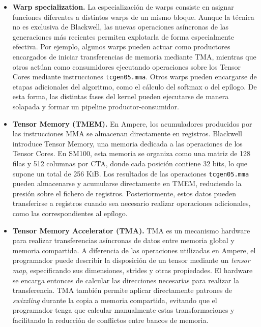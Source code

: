\begin{itemize}

\item \textbf{Warp specialization.}
La especialización de warps consiste en asignar funciones diferentes a distintos warps de un mismo bloque. Aunque la técnica no es exclusiva de Blackwell, las nuevas operaciones asíncronas de las generaciones más recientes permiten explotarla de forma especialmente efectiva. Por ejemplo, algunos warps pueden actuar como productores encargados de iniciar transferencias de memoria mediante TMA, mientras que otros actúan como consumidores ejecutando operaciones sobre los Tensor Cores mediante instrucciones \texttt{tcgen05.mma}. Otros warps pueden encargarse de etapas adicionales del algoritmo, como el cálculo del softmax o del epílogo. De esta forma, las distintas fases del kernel pueden ejecutarse de manera solapada y formar un pipeline productor-consumidor.

\item \textbf{Tensor Memory (TMEM).}
En Ampere, los acumuladores producidos por las instrucciones MMA se almacenan directamente en registros. Blackwell introduce Tensor Memory, una memoria dedicada a las operaciones de los Tensor Cores. En SM100, esta memoria se organiza como una matriz de 128 filas y 512 columnas por CTA, donde cada posición contiene 32 bits, lo que supone un total de 256 KiB. Los resultados de las operaciones \texttt{tcgen05.mma} pueden almacenarse y acumularse directamente en TMEM, reduciendo la presión sobre el fichero de registros. Posteriormente, estos datos pueden transferirse a registros cuando sea necesario realizar operaciones adicionales, como las correspondientes al epílogo.

\item \textbf{Tensor Memory Accelerator (TMA).}
TMA es un mecanismo hardware para realizar transferencias asíncronas de datos entre memoria global y memoria compartida. A diferencia de las operaciones utilizadas en Ampere, el programador puede describir la disposición de un tensor mediante un \textit{tensor map}, especificando sus dimensiones, strides y otras propiedades. El hardware se encarga entonces de calcular las direcciones necesarias para realizar la transferencia. TMA también permite aplicar directamente patrones de \textit{swizzling} durante la copia a memoria compartida, evitando que el programador tenga que calcular manualmente estas transformaciones y facilitando la reducción de conflictos entre bancos de memoria.


\end{itemize}
